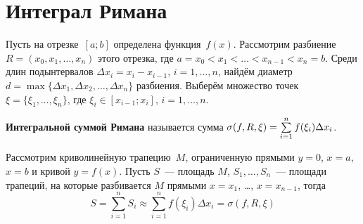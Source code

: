 \section{Интеграл Римана}
Пусть на отрезке~$[a; b]$ определена функция~$f(x)$.
Рассмотрим разбиение~$R = (x_0, x_1, \ldots, x_n)$ этого отрезка, где $a = x_0 < x_1 < \ldots < x_{n-1} < x_n = b$.
Среди длин подынтервалов $\Delta x_i = x_i - x_{i-1}$, $i = 1, \ldots, n$, найдём диаметр $d = \max \{ \Delta x_1, \Delta x_2, \ldots, \Delta x_n \}$ разбиения.
Выберём множество точек $\xi = \{ \xi_1, \ldots, \xi_n \}$, где $\xi_i \in [x_{i-1}; x_i]$, $i = 1, \ldots, n$.

\begin{wrapfigure}[10]{r}{0pt}
\noindent
{}
\end{wrapfigure}

\textbf{Интегральной суммой Римана} называется сумма $\sigma(f, R, \xi) \opbr= \sum\limits_{i=1}^n f(\xi_i) \Delta x_i$.

Рассмотрим криволинейную трапецию~$M$, ограниченную прямыми $y = 0$, $x = a$, $x = b$ и кривой $y = f(x)$. Пусть $S$~--- площадь $M$, $S_1, \ldots, S_n$~--- площади трапеций, на которые разбивается $M$ прямыми $x = x_1$, \ldots, $x = x_{n-1}$, тогда
\begin{equation*}
S = \sum_{i=1}^n S_i \approx \sum_{i=1}^n f(\xi_i) \Delta x_i = \sigma(f, R, \xi)
\end{equation*}

